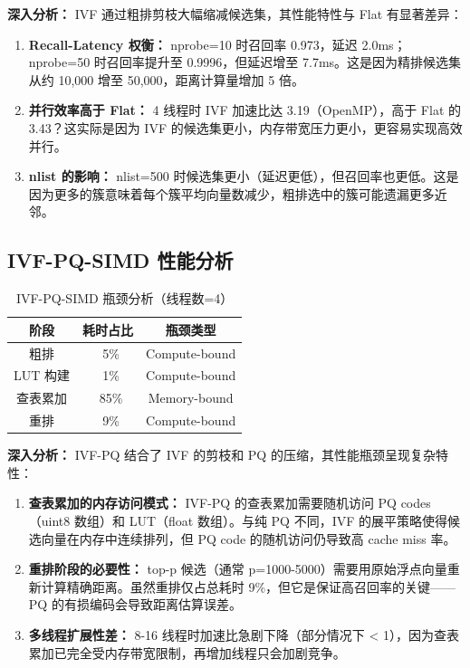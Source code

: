 \documentclass[a4paper]{article}
\begin{document}
\textbf{深入分析：} IVF 通过粗排剪枝大幅缩减候选集，其性能特性与 Flat 有显著差异：

\begin{enumerate}
\item \textbf{Recall-Latency 权衡：} nprobe=10 时召回率 0.973，延迟 2.0ms；nprobe=50 时召回率提升至 0.9996，但延迟增至 7.7ms。这是因为精排候选集从约 10,000 增至 50,000，距离计算量增加 5 倍。
\item \textbf{并行效率高于 Flat：} 4 线程时 IVF 加速比达 3.19（OpenMP），高于 Flat 的 3.43？这实际是因为 IVF 的候选集更小，内存带宽压力更小，更容易实现高效并行。
\item \textbf{nlist 的影响：} nlist=500 时候选集更小（延迟更低），但召回率也更低。这是因为更多的簇意味着每个簇平均向量数减少，粗排选中的簇可能遗漏更多近邻。
\end{enumerate}

\subsection{IVF-PQ-SIMD 性能分析}

\begin{table}[htbp]
\centering
\caption{IVF-PQ-SIMD 瓶颈分析（线程数=4）}
\begin{tabular}{ccc}
\toprule
阶段 & 耗时占比 & 瓶颈类型 \\
\midrule
粗排 & ~5\% & Compute-bound \\
LUT 构建 & ~1\% & Compute-bound \\
查表累加 & ~85\% & Memory-bound \\
重排 & ~9\% & Compute-bound \\
\bottomrule
\end{tabular}
\end{table}

\textbf{深入分析：} IVF-PQ 结合了 IVF 的剪枝和 PQ 的压缩，其性能瓶颈呈现复杂特性：

\begin{enumerate}
\item \textbf{查表累加的内存访问模式：} IVF-PQ 的查表累加需要随机访问 PQ codes（uint8 数组）和 LUT（float 数组）。与纯 PQ 不同，IVF 的展平策略使得候选向量在内存中连续排列，但 PQ code 的随机访问仍导致高 cache miss 率。
\item \textbf{重排阶段的必要性：} top-p 候选（通常 p=1000-5000）需要用原始浮点向量重新计算精确距离。虽然重排仅占总耗时 9\%，但它是保证高召回率的关键——PQ 的有损编码会导致距离估算误差。
\item \textbf{多线程扩展性差：} 8-16 线程时加速比急剧下降（部分情况下 < 1），因为查表累加已完全受内存带宽限制，再增加线程只会加剧竞争。
\end{enumerate}
\end{document}

